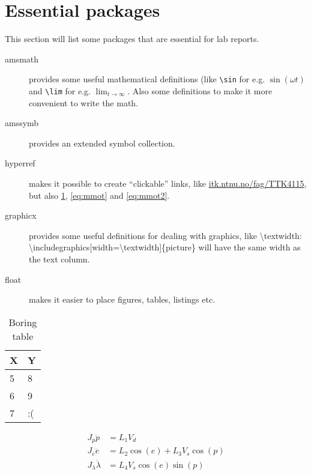\section{Essential packages}

This section will list some packages that are essential for lab reports. %

\begin{description}
	\item[amsmath] provides some useful mathematical definitions (like \texttt{\textbackslash sin} for e.g. $\sin(\omega t)$ and \texttt{\textbackslash lim} for e.g. $\lim_{t\to\infty}$. Also some definitions to make it more convenient to write the math.
	\item[amssymb] provides an extended symbol collection.
	\item[hyperref] makes it possible to create ``clickable'' links, like \url{itk.ntnu.no/fag/TTK4115}, but also \cref{tab:extab}, \cref{eq:mmot} and \cref{eq:mmot2}.
	\item[graphicx] provides some useful definitions for dealing with graphics, like \textbackslash textwidth: \textbackslash includegraphics[width=\textbackslash textwidth]\{picture\} will have the same width as the text column.
	\item[float] makes it easier to place figures, tables, listings etc.
\end{description}
\begin{table}
	\caption{Boring table}
	\centering
	\begin{tabular}{ll}
		\hline
		\textbf{X} & \textbf{Y}\\
		\hline
		5 & 8\\
		6 & 9\\
		7& :( \\
	\hline
	\end{tabular}
	\label{tab:extab}
\end{table}

\begin{subequations}
  \begin{align}
    J_p\ddot{p} &= L_{1}V_{d} \label{eq:mmot1}\\
    J_e\ddot{e} &= L_{2} \cos(e) + L_3 V_s \cos(p) \label{eq:mmot2}\\
    J_\lambda \ddot{\lambda} &= L_4 V_s \cos(e) \sin(p) \label{eq:mmot3}
  \end{align}
  \label{eq:mmot}
\end{subequations}


